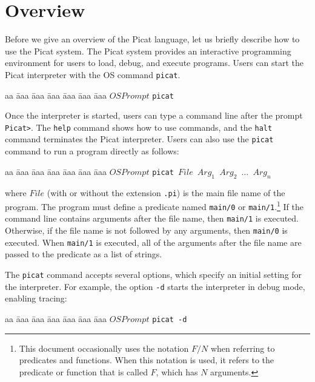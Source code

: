 \chapter{\label{chapter:overview}Overview}
Before we give an overview of the Picat language, let us briefly describe how to use the Picat system. The Picat system provides an interactive programming environment for users to load, debug, and execute programs. Users can start the Picat interpreter with the OS command \texttt{picat}.
\begin{tabbing}
aa \= aaa \= aaa \= aaa \= aaa \= aaa \= aaa \kill
\> \> $OSPrompt$ \texttt{picat}
\end{tabbing}
Once the interpreter is started, users can type a command line after the prompt \verb+Picat>+. The \texttt{help} command shows how to use commands, and the \texttt{halt} command terminates the Picat interpreter. Users can also use the \texttt{picat} command to run a program directly as follows:
\begin{tabbing}
aa \= aaa \= aaa \= aaa \= aaa \= aaa \= aaa \kill
\> \> $OSPrompt$ \texttt{picat $File$ $Arg_1$ $Arg_2$ $\ldots$ $Arg_n$}
\end{tabbing}
where $File$ (with or without the extension \texttt{.pi}) is the main file name of the program. The program must define a predicate named \texttt{main/0} or \texttt{main/1}.\footnote{This document occasionally uses the notation $F/N$ when referring to predicates and functions.  When this notation is used, it refers to the predicate or function that is called $F$, which has $N$ arguments.} If the command line contains arguments after the file name, then \texttt{main/1} is executed. Otherwise, if the file name is not followed by any arguments, then \texttt{main/0} is executed. When \texttt{main/1} is executed, all of the arguments after the file name are passed to the predicate as a list of strings.

The \texttt{picat} command accepts several options, which specify an initial setting for the interpreter. For example, the option \texttt{-d} starts the interpreter in debug mode, enabling tracing:
\begin{tabbing}
aa \= aaa \= aaa \= aaa \= aaa \= aaa \= aaa \kill
\> \> $OSPrompt$ \texttt{picat -d}
\end{tabbing}

